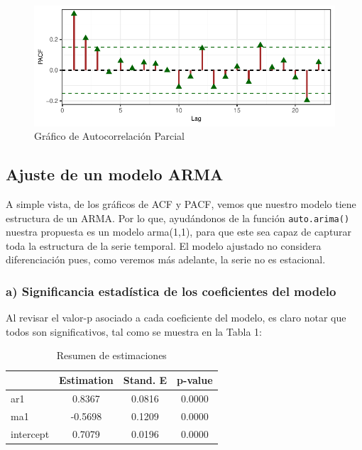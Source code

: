 \documentclass[
  letterpaper,
  DIV=11,
  numbers=noendperiod,
  twocolumn]{scrartcl}
\begin{document}
\begin{figure}[H]

{\centering \includegraphics{pdf_tarea2_files/figure-pdf/fig-exp4-1.pdf}

}

\caption{\label{fig-exp4}Gráfico de Autocorrelación Parcial}

\end{figure}

\hypertarget{ajuste-de-un-modelo-arma}{%
\subsection{Ajuste de un modelo ARMA}\label{ajuste-de-un-modelo-arma}}

A simple vista, de los gráficos de ACF y PACF, vemos que nuestro modelo
tiene estructura de un ARMA. Por lo que, ayudándonos de la función
\texttt{auto.arima()} nuestra propuesta es un modelo arma(1,1), para que
este sea capaz de capturar toda la estructura de la serie temporal. El
modelo ajustado no considera diferenciación pues, como veremos más
adelante, la serie no es estacional.

\hypertarget{a-significancia-estaduxedstica-de-los-coeficientes-del-modelo}{%
\subsubsection{a) Significancia estadística de los coeficientes del
modelo}\label{a-significancia-estaduxedstica-de-los-coeficientes-del-modelo}}

Al revisar el valor-p asociado a cada coeficiente del modelo, es claro
notar que todos son significativos, tal como se muestra en la Tabla 1:

\begin{table}[H]
  \centering
  \caption{Resumen de estimaciones}
  \begin{tabular}{lccc}
    \toprule
     & Estimation & Stand. E & p-value \\
    \midrule
    ar1        & 0.8367     & 0.0816         & 0.0000 \\
    ma1        & -0.5698    & 0.1209         & 0.0000 \\
    intercept  & 0.7079     & 0.0196         & 0.0000 \\
    \bottomrule
  \end{tabular}
  
\end{table}
\end{document}
